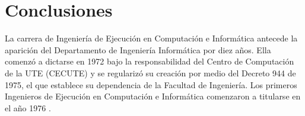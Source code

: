 \chapter{Conclusiones}
\label{cap:conclusiones}
La carrera de Ingeniería de Ejecución en Computación e Informática antecede la aparición del Departamento de Ingeniería Informática por diez años. Ella comenzó a dictarse en 1972 bajo la responsabilidad del Centro de Computación de la UTE (CECUTE) y se regularizó su creación por medio del Decreto 944 de 1975, el que establece su dependencia de la Facultad de Ingeniería. Los primeros Ingenieros de Ejecución en Computación e Informática comenzaron a titularse en el año 1976 \citep{delgado2016exposicion}.